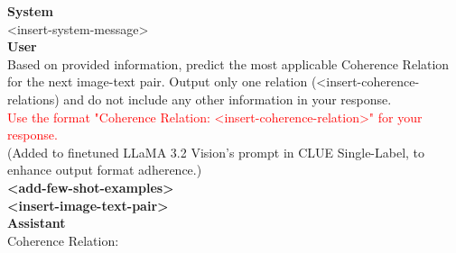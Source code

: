 \begin{figure*}[t]
    \centering
    \begin{tcolorbox}[title={Zero/Few Shot Prompt for DisREL, Tweet Subtitles and CLUE Single-Label}, colframe = red!30, colback = red!10, coltitle = red!20!black, after skip=0pt, boxsep=5pt, width=\textwidth]
    
    \textbf{System} \\
    <insert-system-message> \\
    
    \textbf{User} \\
    Based on provided information, predict the most applicable Coherence Relation for the next image-text pair. Output only one relation (<insert-coherence-relations) and do not include any other information in your response. \\

    \textcolor{red}{Use the format "Coherence Relation: <insert-coherence-relation>" for your response.} \\
    (Added to finetuned LLaMA 3.2 Vision's prompt in CLUE Single-Label, to enhance output format adherence.) \\
    
    \textbf{<add-few-shot-examples>} \\
    
    \textbf{<insert-image-text-pair>} \\
    
    \textbf{Assistant} \\
    Coherence Relation:
    
    \end{tcolorbox}
\end{figure*}

